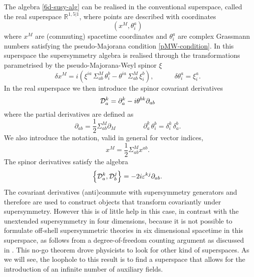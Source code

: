 The algebra \eqref{6d-susy-alg} can be realised in the conventional superspace, called the real superspace \( \mathbb{R}^{1,5|1} \), where points are described with coordinates
\begin{equation}
\left( x^M, \theta^a_i \right) 
\end{equation} 
 where $x^M$ are (commuting) spacetime coordinates and $\theta^a_i$ are complex Grassmann numbers satisfying the pseudo-Majorana condition \eqref{pMW-condition}.
In this superspace the supersymmetry algebra is realised through the transformations parametrised by the pseudo-Majorana-Weyl spinor $\xi$
\begin{equation}
\delta x^M 
= i \left(
\xi^{ia} \, \Sigma^M_{ab} \, \theta^b_i
- \theta^{ia} \, \Sigma^M_{ab} \, \xi^b_i
\right),
\hspace{3em}
\delta\theta^a_i =  \xi^a_i. 
\end{equation}
In the real superspace we then introduce the spinor covariant derivatives
\begin{equation}\label{spinor-covD-usual}
{ \mathcal{D} }_a^k  = \partial_a^k - i \theta^{bk} \partial_{ab}
\end{equation}
where the partial derivatives are defined as
\begin{equation}
\partial_{ab} 
= \frac{1}{2} \Sigma^M_{ab} \partial_M 
%
\qquad\qquad
%
\partial_a^k \, \theta^b_i = \delta^k_i \, \delta^b_a.
\end{equation}
We also introduce the notation, valid in general for vector indices,
\begin{equation}
x^M = \frac{1}{2}\Sigma^M_{ab} x^{ab}.
\end{equation}
The spinor derivatives satisfy the algebra
\begin{equation}
\left\{
{ \mathcal{D} }^k_a   ,  { \mathcal{D} }^j_b
\right\}
	=
- 2 i \varepsilon^{kj} \partial_{ab}.
\end{equation}
The covariant derivatives (anti)commute with supersymmetry generators and therefore are used to construct objects that transform covariantly under supersymmetry. However this is of little help in this case, in contrast with the unextended supersymmetry in four dimensions, because it is not possible to formulate off-shell supersymmetric theories in six dimensional spacetime in this superspace, as follows from a degree-of-freedom counting argument as discussed in \cite{Howe:1983fr,Galperin:book}.
This no-go theorem drove physicists to look for other kind of superspaces. As we will see, the loophole to this result is to find a superspace that allows for the introduction of an infinite number of auxiliary fields.


